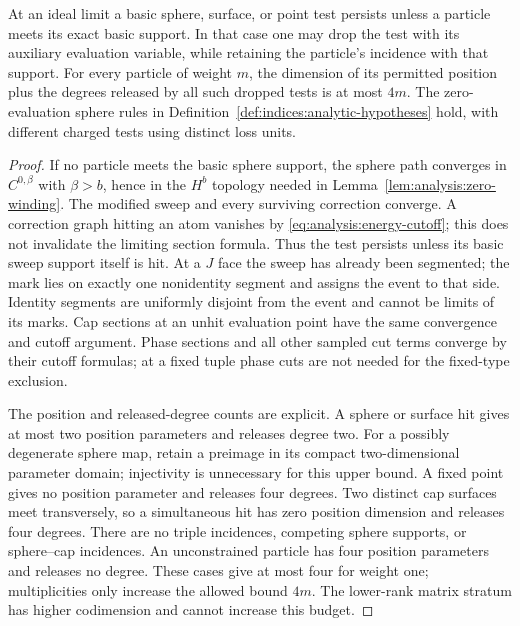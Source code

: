 \begin{lemma}
\label{lem:analysis:incidence}
At an ideal limit a basic sphere, surface, or point test persists unless
a particle meets its exact basic support.  In that case one may drop
the test with its auxiliary evaluation variable, while retaining the
particle's incidence with that support.  For every particle of weight
$m$, the dimension of its permitted position plus the degrees released
by all such dropped tests is at most $4m$.  The zero-evaluation sphere
rules in Definition~\ref{def:indices:analytic-hypotheses} hold, with
different charged tests using distinct loss units.
\end{lemma}
\begin{proof}
If no particle meets the basic sphere support, the sphere path converges in
$C^{0,\beta}$ with $\beta>b$, hence in the $H^b$ topology needed in
Lemma~\ref{lem:analysis:zero-winding}.  The modified sweep and every
surviving correction converge.  A correction graph hitting an atom
vanishes by \eqref{eq:analysis:energy-cutoff}; this does not invalidate
the limiting section formula.  Thus the test persists unless its basic
sweep support itself is hit.  At a $J$ face the sweep has already been
segmented; the mark lies on exactly one nonidentity segment and assigns
the event to that side.  Identity segments are uniformly disjoint from
the event and cannot be limits of its marks.  Cap sections at an
unhit evaluation point have the same convergence and cutoff argument.
Phase sections and all other sampled cut terms converge by their
cutoff formulas; at a fixed tuple phase cuts are not needed for the
fixed-type exclusion.

The position and released-degree counts are explicit.  A sphere or
surface hit gives at most two position parameters and releases degree
two.  For a possibly degenerate sphere map, retain a preimage in its
compact two-dimensional parameter domain; injectivity is unnecessary
for this upper bound.  A fixed point gives no position parameter and
releases four degrees.  Two distinct cap surfaces meet transversely,
so a simultaneous hit has zero position dimension and releases four
degrees.  There are no triple incidences, competing sphere supports,
or sphere--cap incidences.  An unconstrained particle has four position
parameters and releases no degree.  These cases give at most four for
weight one; multiplicities only increase the allowed bound $4m$.
The lower-rank matrix stratum has higher codimension and cannot increase
this budget.


\end{proof}
